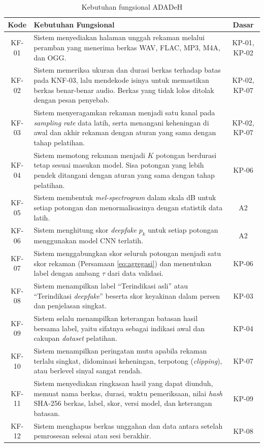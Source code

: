 \begin{table}[t]
  \centering
  \small
  \caption{Kebutuhan fungsional ADADeH}
  \label{tab:kf}
  \renewcommand{\arraystretch}{1.25}
  \begin{tabularx}{\textwidth}{| c | X | c |}
    \hline
    \textbf{Kode} & \textbf{Kebutuhan Fungsional} & \textbf{Dasar} \\
    \hline
    KF-01 & Sistem menyediakan halaman unggah rekaman melalui peramban yang menerima berkas WAV, FLAC, MP3, M4A, dan OGG. & KP-01, KP-02 \\
    KF-02 & Sistem memeriksa ukuran dan durasi berkas terhadap batas pada KNF-03, lalu mendekode isinya untuk memastikan berkas benar-benar audio. Berkas yang tidak lolos ditolak dengan pesan penyebab. & KP-02, KP-07 \\
    KF-03 & Sistem menyeragamkan rekaman menjadi satu kanal pada \textit{sampling rate} data latih, serta menangani keheningan di awal dan akhir rekaman dengan aturan yang sama dengan tahap pelatihan. & KP-02, KP-07 \\
    KF-04 & Sistem memotong rekaman menjadi $K$ potongan berdurasi tetap sesuai masukan model. Sisa potongan yang lebih pendek ditangani dengan aturan yang sama dengan tahap pelatihan. & KP-06 \\
    KF-05 & Sistem membentuk \textit{mel-spectrogram} dalam skala dB untuk setiap potongan dan menormalisasinya dengan statistik data latih. & A2 \\
    KF-06 & Sistem menghitung skor \textit{deepfake} $p_k$ untuk setiap potongan menggunakan model CNN terlatih. & A2 \\
    KF-07 & Sistem menggabungkan skor seluruh potongan menjadi satu skor rekaman (Persamaan \ref{eq:agregasi}) dan menentukan label dengan ambang $\tau$ dari data validasi. & KP-06 \\
    KF-08 & Sistem menampilkan label ``Terindikasi asli'' atau ``Terindikasi \textit{deepfake}'' beserta skor keyakinan dalam persen dan penjelasan singkat. & KP-03 \\
    KF-09 & Sistem selalu menampilkan keterangan batasan hasil bersama label, yaitu sifatnya sebagai indikasi awal dan cakupan \textit{dataset} pelatihan. & KP-04 \\
    KF-10 & Sistem menampilkan peringatan mutu apabila rekaman terlalu singkat, didominasi keheningan, terpotong (\textit{clipping}), atau berlevel sinyal sangat rendah. & KP-07 \\
    KF-11 & Sistem menyediakan ringkasan hasil yang dapat diunduh, memuat nama berkas, durasi, waktu pemeriksaan, nilai \textit{hash} SHA-256 berkas, label, skor, versi model, dan keterangan batasan. & KP-09 \\
    KF-12 & Sistem menghapus berkas unggahan dan data antara setelah pemrosesan selesai atau sesi berakhir. & KP-08 \\
    \hline
  \end{tabularx}
\end{table}


